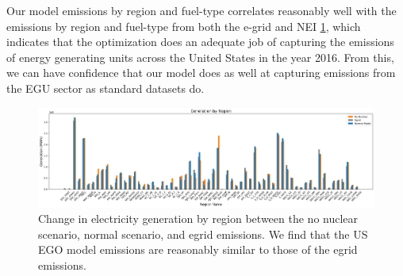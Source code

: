 \documentclass[12]{article}
\begin{document}
Our model emissions by region and fuel-type correlates reasonably well with the emissions by region and fuel-type from both the e-grid and NEI \ref{fig:emissions_region}, which indicates that the optimization does an adequate job of capturing the emissions of energy generating units across the United States in the year 2016. From this, we can have confidence that our model does as well at capturing emissions from the EGU sector as standard datasets do.

\begin{figure}
    \centering
    \includegraphics[scale=0.3]{ego_nonuclear_project/Figures/region_name_all.png}
    \caption{Change in electricity generation by region between the no nuclear scenario, normal scenario, and egrid emissions. We find that the US EGO model emissions are reasonably similar to those of the egrid emissions.} 
    \label{fig:emissions_region}
\end{figure}
\end{document}
